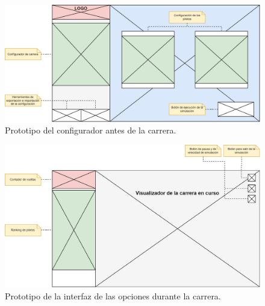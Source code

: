 \begin{figure}[H]
    \centering
    \includegraphics[width=\textwidth]{imagenes/pag1-proto.png}
    \caption{Prototipo del configurador antes de la carrera.}
    \label{fig:protoconfig}
 \end{figure}

 \begin{figure}[H]
    \centering
    \includegraphics[width=\textwidth]{imagenes/pag2-proto.png}
    \caption{Prototipo de la interfaz de las opciones durante la carrera.}
    \label{fig:protoranking}
 \end{figure}